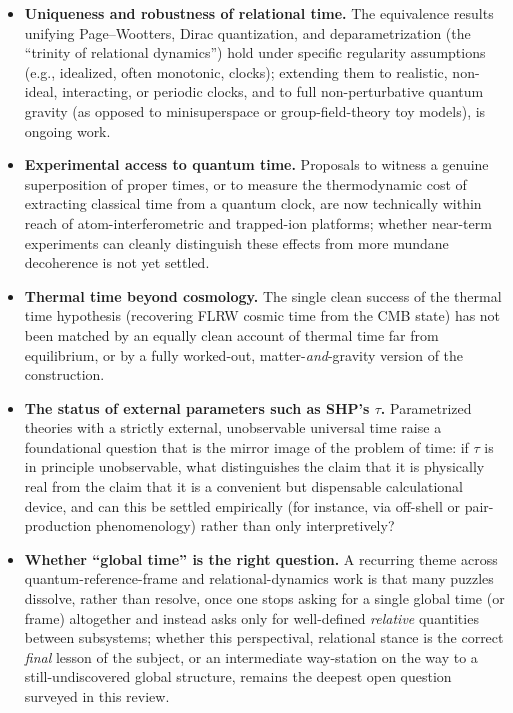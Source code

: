 \documentclass[11pt]{article}
\begin{document}
\begin{itemize}
\item \textbf{Uniqueness and robustness of relational time.} The equivalence results unifying Page--Wootters, Dirac quantization, and deparametrization (the ``trinity of relational dynamics'') hold under specific regularity assumptions (e.g., idealized, often monotonic, clocks); extending them to realistic, non-ideal, interacting, or periodic clocks, and to full non-perturbative quantum gravity (as opposed to minisuperspace or group-field-theory toy models), is ongoing work.
\item \textbf{Experimental access to quantum time.} Proposals to witness a genuine superposition of proper times, or to measure the thermodynamic cost of extracting classical time from a quantum clock, are now technically within reach of atom-interferometric and trapped-ion platforms; whether near-term experiments can cleanly distinguish these effects from more mundane decoherence is not yet settled.
\item \textbf{Thermal time beyond cosmology.} The single clean success of the thermal time hypothesis (recovering FLRW cosmic time from the CMB state) has not been matched by an equally clean account of thermal time far from equilibrium, or by a fully worked-out, matter-\emph{and}-gravity version of the construction.
\item \textbf{The status of external parameters such as SHP's $\tau$.} Parametrized theories with a strictly external, unobservable universal time raise a foundational question that is the mirror image of the problem of time: if $\tau$ is in principle unobservable, what distinguishes the claim that it is physically real from the claim that it is a convenient but dispensable calculational device, and can this be settled empirically (for instance, via off-shell or pair-production phenomenology) rather than only interpretively?
\item \textbf{Whether ``global time'' is the right question.} A recurring theme across quantum-reference-frame and relational-dynamics work is that many puzzles dissolve, rather than resolve, once one stops asking for a single global time (or frame) altogether and instead asks only for well-defined \emph{relative} quantities between subsystems; whether this perspectival, relational stance is the correct \emph{final} lesson of the subject, or an intermediate way-station on the way to a still-undiscovered global structure, remains the deepest open question surveyed in this review.
\end{itemize}
\end{document}
